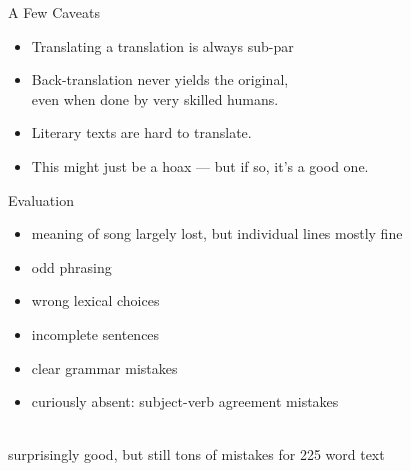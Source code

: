 \documentclass[xcolor={usenames,svgnames,x11names,dvipsnames,table}]{beamer}
\begin{document}
\begin{frame}{A Few Caveats}
    \begin{itemize}
        \item Translating a translation is always sub-par\\
        \item Back-translation never yields the original,\\
            even when done by very skilled humans.
        \item Literary texts are hard to translate.
        \item This might just be a hoax --- but if so, it's a good one.
    \end{itemize}
\end{frame}

\begin{frame}{Evaluation}
    \begin{itemize}
        \item meaning of song largely lost, but individual lines mostly fine
        \item odd phrasing\\
        \item wrong lexical choices\\
        \item incomplete sentences\\
        \item clear grammar mistakes\\
        \item curiously absent: subject-verb agreement mistakes
    \end{itemize}

    \\
    surprisingly good, but still tons of mistakes for 225 word text
\end{frame}
\end{document}
